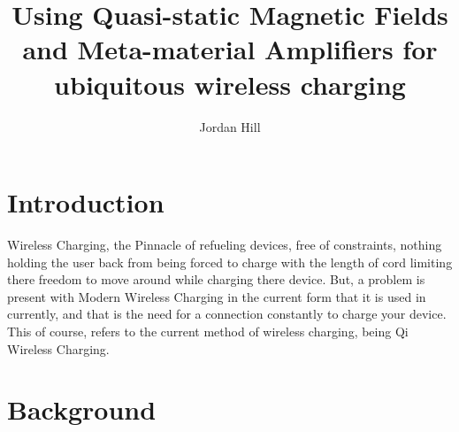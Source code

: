 \documentclass[]{article}
\title{Using Quasi-static Magnetic Fields and Meta-material Amplifiers for ubiquitous wireless charging}
\author{Jordan Hill}
\begin{document}
\maketitle

\begin{abstract}

\end{abstract}

\section{Introduction}
Wireless Charging, the Pinnacle of refueling devices, free of constraints, nothing holding the user back from being forced to charge with the length of cord limiting there freedom to move around while charging there device. But, a problem is present with Modern Wireless Charging in the current form that it is used in currently, and that is the need for a connection constantly to charge your device. This of course, refers to the current method of wireless charging, being Qi Wireless Charging.  
\section{Background}
\end{document}
